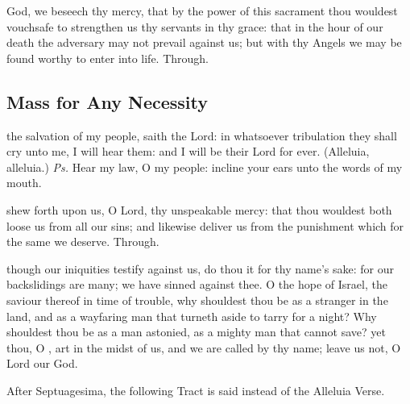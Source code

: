 
\postcommunion
{} God, we beseech thy mercy, that by the power of this sacrament thou wouldest vouchsafe to strengthen us thy servants in thy grace: that in the hour of our death the adversary may not prevail against us; but with thy Angels we may be found worthy to enter into life. Through.


\clearpage
\subsection{Mass for Any Necessity}

\introit
{} the salvation of my people, saith the Lord: in whatsoever tribulation they shall cry unto me, I will hear them: and I will be their Lord for ever. (Alleluia, alleluia.) \textit{Ps.} Hear my law, O my people: incline your ears unto the words of my mouth.

\collect
{} shew forth upon us, O Lord, thy unspeakable mercy: that thou wouldest both loose us from all our sins; and likewise deliver us from the punishment which for the same we deserve. Through.

 though our iniquities testify against us, do thou it for thy name's sake: for our backslidings are many; we have sinned against thee. O the hope of Israel, the saviour thereof in time of trouble, why shouldest thou be as a stranger in the land, and as a wayfaring man that turneth aside to tarry for a night? Why shouldest thou be as a man astonied, as a mighty man that cannot save? yet thou, O , art in the midst of us, and we are called by thy name; leave us not, O Lord our God.


\begin{rubric}
    After Septuagesima, the following Tract is said instead of the Alleluia Verse.
\end{rubric}

